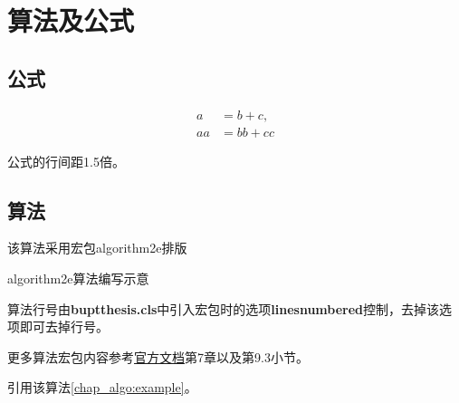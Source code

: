 \chapter{算法及公式}

\section{公式}

\begin{align}
a &= b+c, \\
aa &= bb+cc
\end{align}

公式的行间距1.5倍。

\section{算法}

\begin{algorithm}[!htb]
	该算法采用宏包algorithm2e排版\;
	\BlankLine
	 {
	}
	\caption{algorithm2e算法编写示意}
	\label{chap_algo:example}
\end{algorithm}

算法行号由\textbf{buptthesis.cls}中引入宏包\latextext{\RequirePackage[xxx]{algorithm2e}}时的选项\textbf{linesnumbered}控制，去掉该选项即可去掉行号。

更多算法宏包内容参考\href{http://tug.ctan.org/macros/latex/contrib/algorithm2e/doc/algorithm2e.pdf}{官方文档}第7章以及第9.3小节。

引用该算法\ref*{chap_algo:example}。